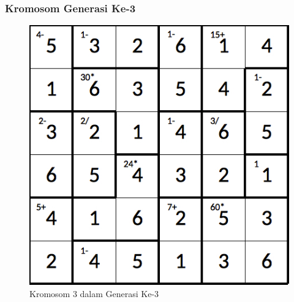 \documentclass{beamer}
\begin{document}
\note{

}

\begin{frame}
\frametitle{Kromosom Generasi Ke-3}
\begin{figure}
\centering
\captionsetup{justification=centering}
\includegraphics[scale=0.333]{Gambar/hybridgenetic/Generation3Chromosome3}
\caption[Kromosom 3 dalam Generasi Ke-3]{Kromosom 3 dalam Generasi Ke-3}
\label{fig:analisisg3k3}
\end{figure}
\end{frame}

\note{

}
\end{document}
